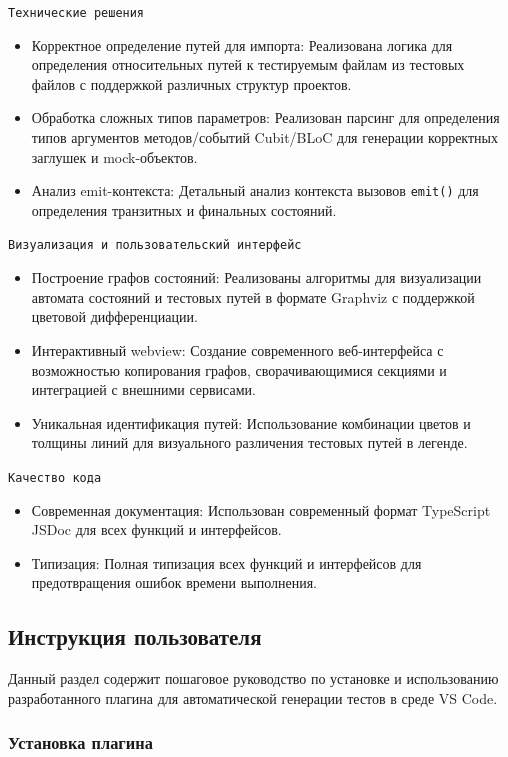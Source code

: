 \documentclass[14pt, russian]{scrartcl}
\begin{document}
\texttt{Технические решения}
\begin{itemize}
    \item Корректное определение путей для импорта: Реализована логика для определения относительных путей к тестируемым файлам из тестовых файлов с поддержкой различных структур проектов.
    \item Обработка сложных типов параметров: Реализован парсинг для определения типов аргументов методов/событий Cubit/BLoC для генерации корректных заглушек и mock-объектов.
    \item Анализ emit-контекста: Детальный анализ контекста вызовов \texttt{emit()} для определения транзитных и финальных состояний.
\end{itemize}

\texttt{Визуализация и пользовательский интерфейс}
\begin{itemize}
    \item Построение графов состояний: Реализованы алгоритмы для визуализации автомата состояний и тестовых путей в формате Graphviz с поддержкой цветовой дифференциации.
    \item Интерактивный webview: Создание современного веб-интерфейса с возможностью копирования графов, сворачивающимися секциями и интеграцией с внешними сервисами.
    \item Уникальная идентификация путей: Использование комбинации цветов и толщины линий для визуального различения тестовых путей в легенде.
\end{itemize}

\texttt{Качество кода}
\begin{itemize}
    \item Современная документация: Использован современный формат TypeScript JSDoc для всех функций и интерфейсов.
    \item Типизация: Полная типизация всех функций и интерфейсов для предотвращения ошибок времени выполнения.
\end{itemize}

\subsection{Инструкция пользователя}

Данный раздел содержит пошаговое руководство по установке и использованию разработанного плагина для автоматической генерации тестов в среде VS Code.

\subsubsection{Установка плагина}
\end{document}
